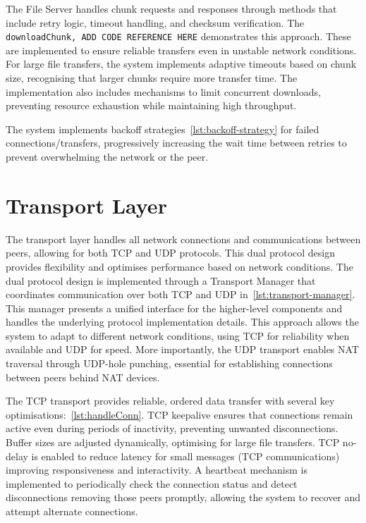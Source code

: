 \documentclass[12pt,a4paper]{report}
\begin{document}
The File Server handles chunk requests and responses through methods that include retry logic, timeout handling, and checksum verification. The \texttt{downloadChunk, ADD CODE REFERENCE HERE} demonstrates this approach. These are implemented to ensure reliable transfers even in unstable network conditions. For large file transfers, the system implements adaptive timeouts based on chunk size, recognising that larger chunks require more transfer time. The implementation also includes mechanisms to limit concurrent downloads, preventing resource exhaustion while maintaining high throughput.

The system implements backoff strategies~\ref{lst:backoff-strategy} for failed connections/transfers, progressively increasing the wait time between retries to prevent overwhelming the network or the peer.

\section{Transport Layer}
The transport layer handles all network connections and communications between peers, allowing for both TCP and UDP protocols. This dual protocol design provides flexibility and optimises performance based on network conditions. The dual protocol design is implemented through a Transport Manager that coordinates communication over both TCP and UDP in~\ref{lst:transport-manager}. This manager presents a unified interface for the higher-level components and handles the underlying protocol implementation details. This approach allows the system to adapt to different network conditions, using TCP for reliability when available and UDP for speed. More importantly, the UDP transport enables NAT traversal through UDP-hole punching, essential for establishing connections between peers behind NAT devices.

The TCP transport provides reliable, ordered data transfer with several key optimisations:~\ref{lst:handleConn}. TCP keepalive ensures that connections remain active even during periods of inactivity, preventing unwanted disconnections. Buffer sizes are adjusted dynamically, optimising for large file transfers. TCP no-delay is enabled to reduce latency for small messages (TCP communications) improving responsiveness and interactivity. A heartbeat mechanism is implemented to periodically check the connection status and detect disconnections removing those peers promptly, allowing the system to recover and attempt alternate connections.
\end{document}
